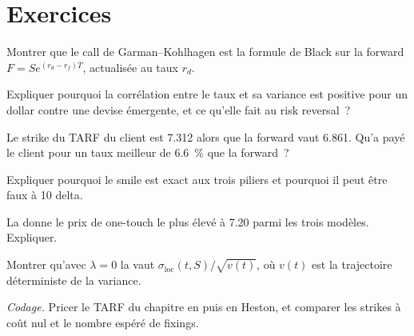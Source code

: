 \section{Exercices}

\begin{exercise}[$\star$]\label{exo:dv:fx-derivatives:1}
Montrer que le call de Garman--Kohlhagen est la formule de Black sur la forward $F=Se^{(r_d-r_f)T}$, actualisée au taux $r_d$.
\end{exercise}

\begin{exercise}[$\star$]\label{exo:dv:fx-derivatives:2}
Expliquer pourquoi la corrélation entre le taux et sa variance est positive pour un dollar contre une devise émergente, et ce
qu'elle fait au risk reversal~?
\end{exercise}

\begin{exercise}[$\star$]\label{exo:dv:fx-derivatives:3}
Le strike du TARF du client est 7.312 alors que la forward vaut 6.861. Qu'a payé le client pour un taux meilleur de 6.6~\% que la forward~?
\end{exercise}

\begin{exercise}[$\star\star$]\label{exo:dv:fx-derivatives:4}
Expliquer pourquoi le smile  est exact aux trois piliers et pourquoi il peut être faux à 10 delta.
\end{exercise}

\begin{exercise}[$\star\star$]\label{exo:dv:fx-derivatives:5}
La  donne le prix de one-touch le plus élevé à 7.20 parmi les trois modèles. Expliquer.
\end{exercise}

\begin{exercise}[$\star\star$]\label{exo:dv:fx-derivatives:6}
Montrer qu'avec $\lambda=0$ la  vaut $\sigma_{\mathrm{loc}}(t,S)/\sqrt{v(t)}$, où $v(t)$ est la trajectoire déterministe de la variance.
\end{exercise}

\begin{exercise}[$\star\star\star$]\label{exo:dv:fx-derivatives:7}
\emph{Codage.} Pricer le TARF du chapitre en  puis en Heston, et comparer les strikes à coût nul et le nombre espéré de
fixings.
\end{exercise}

